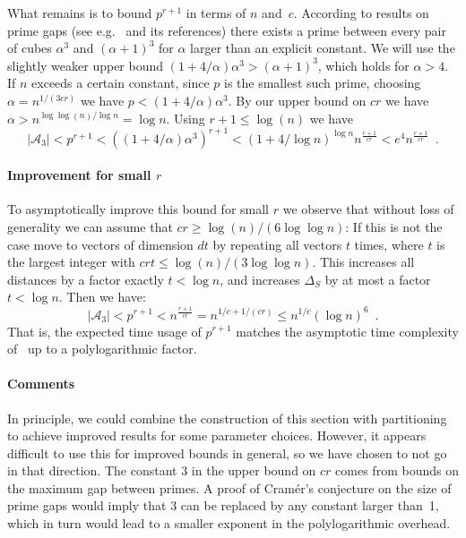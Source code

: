 \documentclass[prodmode,acmtalg]{acmsmall}
\begin{document}
What remains is to bound $p^{r+1}$ in terms of $n$ and~$c$.
According to results on prime gaps (see e.g.~\cite{dudek2014explicit} and its references)
there exists a prime between every pair of cubes $\alpha^3$ and $(\alpha+1)^3$ for $\alpha$ larger than an explicit constant.
We will use the slightly weaker upper bound $(1+4/\alpha) \alpha^3 > (\alpha+1)^3$, which holds for $\alpha > 4$.
If $n$ exceeds a certain constant, since $p$ is the smallest such prime, choosing $\alpha = n^{1/(3cr)}$ we have $p < (1+4/\alpha) \alpha^3$.
By our upper bound on $cr$ we have $\alpha > n^{\log\log(n)/\log n} = \log n$.
Using $r+1 \leq \log(n)$ we have
\begin{equation}
|\mathcal{A}_3| < p^{r+1} < ((1+4/\alpha) \alpha^3)^{r+1} < (1+4/\log n)^{\log n} n^{\frac{r+1}{cr}} < e^4 n^{\frac{r+1}{cr}} \enspace .
\end{equation}


\paragraph{Improvement for small $r$}

To asymptotically improve this bound for small $r$ we observe that without loss of generality we can assume that $cr \geq \log(n)/(6 \log\log n)$: 
If this is not the case move to vectors of dimension $dt$ by repeating all vectors $t$ times, where $t$ is the largest integer with $crt \leq \log(n)/(3 \log\log n)$. 
This increases all distances by a factor exactly $t < \log n$, and increases $\Delta_S$ by at most a factor $t < \log n$.
Then we have:
\begin{equation}\label{eq:smallbound}
|\mathcal{A}_3| < p^{r+1} < n^{\frac{r+1}{cr}} = n^{1/c+1/(cr)} \leq n^{1/c} (\log n)^6 \enspace .
\end{equation}
That is, the expected time usage of $p^{r+1}$ matches the asymptotic time complexity of~\cite{Indyk1998} up to a polylogarithmic factor.


\paragraph{Comments}

In principle, we could combine the construction of this section with partitioning to achieve improved results for some parameter choices.
However, it appears difficult to use this for improved bounds in general, so we have chosen to not go in that direction.
The constant 3 in the upper bound on $cr$ comes from bounds on the maximum gap between primes. A proof of Cramér's conjecture on the size of prime gaps would imply that 3 can be replaced by any constant larger than~1, which in turn would lead to a smaller exponent in the polylogarithmic overhead.
\end{document}
